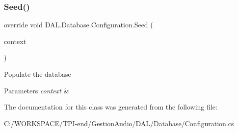 \subsubsection{\texorpdfstring{Seed()}{Seed()}}
{\footnotesize\ttfamily override void D\+A\+L.\+Database.\+Configuration.\+Seed (\begin{DoxyParamCaption}\item[{\hyperlink{class_d_a_l_1_1_database_1_1_db_application_context}{Db\+Application\+Context}}]{context }\end{DoxyParamCaption})\hspace{0.3cm}{\ttfamily [protected]}}



Populate the database 


\begin{DoxyParams}{Parameters}
{\em context} & \\
\hline
\end{DoxyParams}


The documentation for this class was generated from the following file\+:\begin{DoxyCompactItemize}
\item 
C\+:/\+W\+O\+R\+K\+S\+P\+A\+C\+E/\+T\+P\+I-\/end/\+Gestion\+Audio/\+D\+A\+L/\+Database/Configuration.\+cs\end{DoxyCompactItemize}
